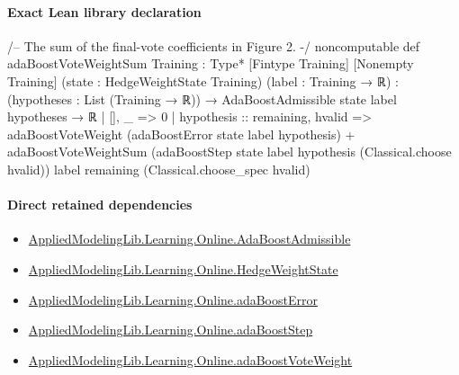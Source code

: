 \documentclass[10pt]{article}
\begin{document}
\paragraph{Exact Lean library declaration}
\begin{ReviewVerbatim}
/-- The sum of the final-vote coefficients in Figure 2. -/
noncomputable def adaBoostVoteWeightSum
    {Training : Type*} [Fintype Training] [Nonempty Training]
    (state : HedgeWeightState Training) (label : Training → ℝ) :
    (hypotheses : List (Training → ℝ)) →
      AdaBoostAdmissible state label hypotheses → ℝ
  | [], _ => 0
  | hypothesis :: remaining, hvalid =>
      adaBoostVoteWeight (adaBoostError state label hypothesis) +
        adaBoostVoteWeightSum
          (adaBoostStep state label hypothesis (Classical.choose hvalid)) label remaining
          (Classical.choose_spec hvalid)
\end{ReviewVerbatim}

\paragraph{Direct retained dependencies}
\begin{itemize}\raggedright
\item \hyperlink{library-prerequisite-2771987b29f636cf}{Applied\allowbreak{}Modeling\allowbreak{}Lib.\allowbreak{}Learning.\allowbreak{}Online.\allowbreak{}Ada\allowbreak{}Boost\allowbreak{}Admissible}
\item \hyperlink{library-prerequisite-8196082d02788389}{Applied\allowbreak{}Modeling\allowbreak{}Lib.\allowbreak{}Learning.\allowbreak{}Online.\allowbreak{}Hedge\allowbreak{}Weight\allowbreak{}State}
\item \hyperlink{governing-declaration-bd631eacbec4687c}{Applied\allowbreak{}Modeling\allowbreak{}Lib.\allowbreak{}Learning.\allowbreak{}Online.\allowbreak{}ada\allowbreak{}Boost\allowbreak{}Error}
\item \hyperlink{governing-declaration-ab9e0307acbbe7ff}{Applied\allowbreak{}Modeling\allowbreak{}Lib.\allowbreak{}Learning.\allowbreak{}Online.\allowbreak{}ada\allowbreak{}Boost\allowbreak{}Step}
\item \hyperlink{governing-declaration-4fae1388d9e0485c}{Applied\allowbreak{}Modeling\allowbreak{}Lib.\allowbreak{}Learning.\allowbreak{}Online.\allowbreak{}ada\allowbreak{}Boost\allowbreak{}Vote\allowbreak{}Weight}
\end{itemize}
\end{document}
